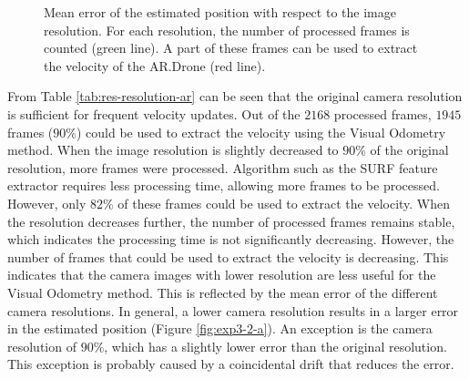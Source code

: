\begin{figure}[htb!]
  \begin{center}

 \end{center}
  \caption{Mean error of the estimated position with respect to the image resolution. For each resolution, the number of processed frames is counted (green line). A part of these frames can be used to extract the velocity of the AR.Drone (red line).}
  \label{fig:exp3-error2}
\end{figure}

From Table \ref{tab:res-resolution-ar} can be seen that the original camera resolution is sufficient for frequent velocity updates.
Out of the $2168$ processed frames, $1945$ frames ($90\%$) could be used to extract the velocity using the Visual Odometry method.
When the image resolution is slightly decreased to $90\%$ of the original resolution, more frames were processed.
Algorithm such as the SURF feature extractor requires less processing time, allowing more frames to be processed.
However, only $82\%$ of these frames could be used to extract the velocity.
When the resolution decreases further, the number of processed frames remains stable, which indicates the processing time is not significantly decreasing.
However, the number of frames that could be used to extract the velocity is decreasing.
This indicates that the camera images with lower resolution are less useful for the Visual Odometry method.
This is reflected by the mean error of the different camera resolutions.
In general, a lower camera resolution results in a larger error in the estimated position (Figure \ref{fig:exp3-2-a}).
An exception is the camera resolution of $90\%$, which has a slightly lower error than the original resolution.
This exception is probably caused by a coincidental drift that reduces the error.

